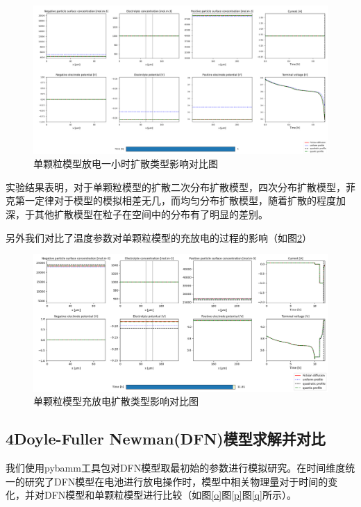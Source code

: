 \documentclass[12pt]{ctexart}%
\begin{document}
\begin{figure}[H]
	\centering
	\includegraphics[scale = 0.32]{K2}
	\caption{单颗粒模型放电一小时扩散类型影响对比图}
	\label{n}
\end{figure}

实验结果表明，对于单颗粒模型的扩散二次分布扩散模型，四次分布扩散模型，菲克第一定律对于模型的模拟相差无几，而均匀分布扩散模型，随着扩散的程度加深，于其他扩散模型在粒子在空间中的分布有了明显的差别。

另外我们对比了温度参数对单颗粒模型的充放电的过程的影响（如图\ref{bb}）
\begin{figure}[h]
	\centering
	\includegraphics[scale = 0.4]{5}
	\caption{单颗粒模型充放电扩散类型影响对比图}
	\label{bb}
\end{figure}

\subsection{4Doyle-Fuller Newman(DFN)模型求解并对比}
我们使用pybamm工具包对DFN模型取最初始的参数进行模拟研究。在时间维度统一的研究了DFN模型在电池进行放电操作时，模型中相关物理量对于时间的变化，并对DFN模型和单颗粒模型进行比较（如图\ref{o}图\ref{p}图\ref{q}所示）。
\end{document}
